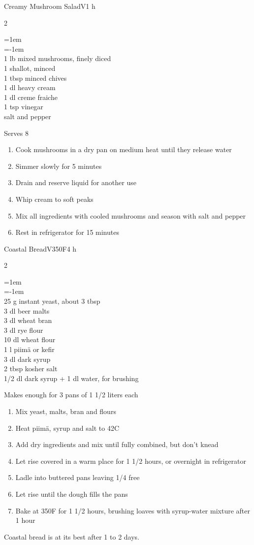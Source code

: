 \documentclass{article}
\newenvironment{recipe}[3][]
    {\begin{cardbase}[#1]{#2}{#3}
    \columnratio{0.333}
    \begin{paracol}{2}}
    {\end{paracol}\end{cardbase}}
\newenvironment{denserecipe}[3][]
    {\small
    \begin{recipe}[#1]{#2}{#3}}
    {\end{recipe}}
\newcommand{\nextcolumn}{\switchcolumn}
\newenvironment{ingredients}
    {
    \begin{obeylines}
    \vspace{\parskip}
    \setlength{\parskip}{0.25em}
    \vspace{-0.25em}
    \leftskip=1em
    \parindent=-1em}
    {\end{obeylines}}
\newenvironment{steps}
    {\begin{enumerate}[leftmargin=*,topsep=0pt]}
    {\end{enumerate}}
\newcommand{\celsius}[1]{#1\textdegree{}C}
\newcommand{\fahrenheit}[1]{#1\textdegree{}F}
\newcommand{\tag}[1]{\hspace{1em}#1}
\newcommand{\symboltag}[2]{\tag{#1\hspace{0.4em}#2}}
\newcommand{\totaltime}[1]{\symboltag{\raisebox{-0.1em}{\small\StopWatchEnd}}{#1}}
\newcommand{\preheat}[1]{\symboltag{\Topbottomheat}{#1}}
\begin{document}
\begin{recipe}{Creamy Mushroom Salad}{\tag{V}\totaltime{1 h}}
\begin{ingredients}
1 lb mixed mushrooms, finely diced
1 shallot, minced
1 tbsp minced chives
1 dl heavy cream
1 dl creme fraiche
1 tsp vinegar
salt and pepper
\end{ingredients}
\nextcolumn
Serves 8
\begin{steps}
    \item Cook mushrooms in a dry pan on medium heat until they release water
    \item Simmer slowly for 5 minutes
    \item Drain and reserve liquid for another use
    \item Whip cream to soft peaks
    \item Mix all ingredients with cooled mushrooms and season with salt and pepper
    \item Rest in refrigerator for 15 minutes
\end{steps}
\end{recipe}

\begin{denserecipe}{Coastal Bread}{\tag{V}\preheat{\fahrenheit{350}}\totaltime{4 h}}
\begin{ingredients}
25 g instant yeast, about 3 tbsp
3 dl beer malts
3 dl wheat bran
3 dl rye flour
10 dl wheat flour
1 l piimä or kefir
3 dl dark syrup
2 tbsp kosher salt
1/2 dl dark syrup + 1 dl water, for brushing
\end{ingredients}
\nextcolumn
Makes enough for 3 pans of 1 1/2 liters each
\begin{steps}
    \item Mix yeast, malts, bran and flours
    \item Heat piimä, syrup and salt to \celsius{42}
    \item Add dry ingredients and mix until fully combined, but don't knead
    \item Let rise covered in a warm place for 1 1/2 hours, or overnight in refrigerator
    \item Ladle into buttered pans leaving 1/4 free
    \item Let rise until the dough fills the pans
    \item Bake at \fahrenheit{350} for 1 1/2 hours, brushing loaves with syrup-water mixture after 1 hour
\end{steps}
Coastal bread is at its best after 1 to 2 days.
\end{denserecipe}
\end{document}
